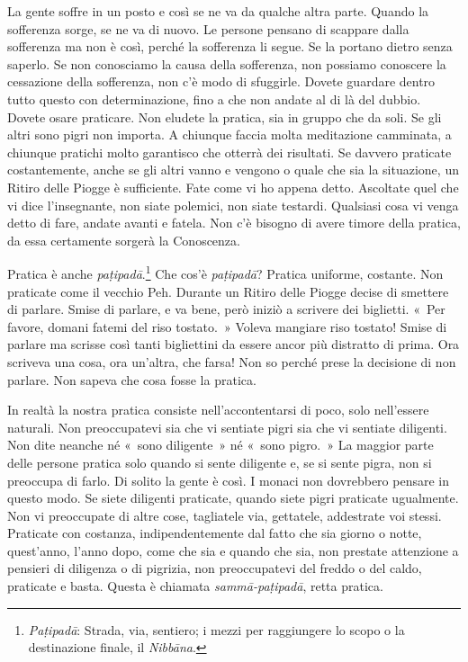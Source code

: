 La gente soffre in un posto e così se ne va da qualche altra parte.
Quando la sofferenza sorge, se ne va di nuovo. Le persone pensano di
scappare dalla sofferenza ma non è così, perché la sofferenza li segue.
Se la portano dietro senza saperlo. Se non conosciamo la causa della
sofferenza, non possiamo conoscere la cessazione della sofferenza, non
c'è modo di sfuggirle. Dovete guardare dentro tutto questo con
determinazione, fino a che non andate al di là del dubbio. Dovete osare
praticare. Non eludete la pratica, sia in gruppo che da soli. Se gli
altri sono pigri non importa. A chiunque faccia molta meditazione
camminata, a chiunque pratichi molto garantisco che otterrà dei
risultati. Se davvero praticate costantemente, anche se gli altri vanno
e vengono o quale che sia la situazione, un Ritiro delle Piogge è
sufficiente. Fate come vi ho appena detto. Ascoltate quel che vi dice
l'insegnante, non siate polemici, non siate testardi. Qualsiasi cosa vi
venga detto di fare, andate avanti e fatela. Non c'è bisogno di avere
timore della pratica, da essa certamente sorgerà la Conoscenza.

Pratica è anche \emph{paṭipadā}.\footnote{\emph{Paṭipadā}: Strada, via,
  sentiero; i mezzi per raggiungere lo scopo o la destinazione finale,
  il \emph{Nibbāna}.} Che cos'è \emph{paṭipadā}? Pratica uniforme,
costante. Non praticate come il vecchio Peh. Durante un Ritiro delle
Piogge decise di smettere di parlare. Smise di parlare, e va bene, però
iniziò a scrivere dei biglietti. «~Per favore, domani fatemi del riso
tostato.~» Voleva mangiare riso tostato! Smise di parlare ma scrisse
così tanti bigliettini da essere ancor più distratto di prima. Ora
scriveva una cosa, ora un'altra, che farsa! Non so perché prese la
decisione di non parlare. Non sapeva che cosa fosse la pratica.

In realtà la nostra pratica consiste nell'accontentarsi di poco, solo
nell'essere naturali. Non preoccupatevi sia che vi sentiate pigri sia
che vi sentiate diligenti. Non dite neanche né «~sono diligente~» né
«~sono pigro.~» La maggior parte delle persone pratica solo quando si
sente diligente e, se si sente pigra, non si preoccupa di farlo. Di
solito la gente è così. I monaci non dovrebbero pensare in questo modo.
Se siete diligenti praticate, quando siete pigri praticate ugualmente.
Non vi preoccupate di altre cose, tagliatele via, gettatele, addestrate
voi stessi. Praticate con costanza, indipendentemente dal fatto che sia
giorno o notte, quest'anno, l'anno dopo, come che sia e quando che sia,
non prestate attenzione a pensieri di diligenza o di pigrizia, non
preoccupatevi del freddo o del caldo, praticate e basta. Questa è
chiamata \emph{sammā-paṭipadā}, retta pratica.

